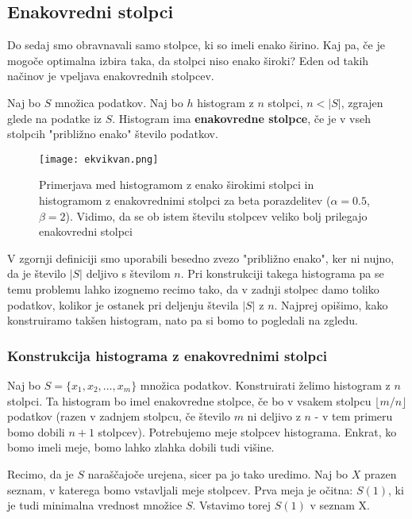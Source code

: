 \subsection{Enakovredni stolpci}

Do sedaj smo obravnavali samo stolpce, ki so imeli enako širino. Kaj pa, če je mogoče optimalna izbira taka, da stolpci niso enako široki? Eden od takih načinov je vpeljava enakovrednih stolpcev.

\begin{definicija}
    Naj bo $S$ množica podatkov. Naj bo $h$ histogram z $n$ stolpci, $n < |S|$, zgrajen glede na podatke iz $S$. Histogram ima \textbf{enakovredne stolpce}, če je v vseh stolpcih "približno enako" število podatkov.
\end{definicija}

\begin{figure}[!h]
    \centering
    \texttt{[image: ekvikvan.png]}
    \caption{Primerjava med histogramom z enako širokimi stolpci in histogramom z enakovrednimi stolpci za beta porazdelitev ($\alpha = 0.5$, $\beta = 2$). Vidimo, da se ob istem številu stolpcev veliko bolj prilegajo enakovredni stolpci}
\end{figure}

V zgornji definiciji smo uporabili besedno zvezo "približno enako", ker ni nujno, da je število $|S|$ deljivo s številom $n$. Pri konstrukciji takega histograma pa se temu problemu lahko izognemo recimo tako, da v zadnji stolpec damo toliko podatkov, kolikor je ostanek pri deljenju števila $|S|$ z $n$. Najprej opišimo, kako konstruiramo takšen histogram, nato pa si bomo to pogledali na zgledu.

\subsubsection*{Konstrukcija histograma z enakovrednimi stolpci}

Naj bo $S = \{x_1, x_2, \ldots, x_m\}$ množica podatkov. Konstruirati želimo histogram z $n$ stolpci. Ta histogram bo imel enakovredne stolpce, če bo v vsakem stolpcu $\lfloor m/n \rfloor$ podatkov (razen v zadnjem stolpcu, če število $m$ ni deljivo z $n$ - v tem primeru bomo dobili $n+1$ stolpcev). Potrebujemo meje stolpcev histograma. Enkrat, ko bomo imeli meje, bomo lahko zlahka dobili tudi višine.

Recimo, da je $S$ naraščajoče urejena, sicer pa jo tako uredimo. Naj bo $X$ prazen seznam, v katerega bomo vstavljali meje stolpcev. Prva meja je očitna: $S(1)$, ki je tudi minimalna vrednost množice $S$. Vstavimo torej $S(1)$ v seznam X.

